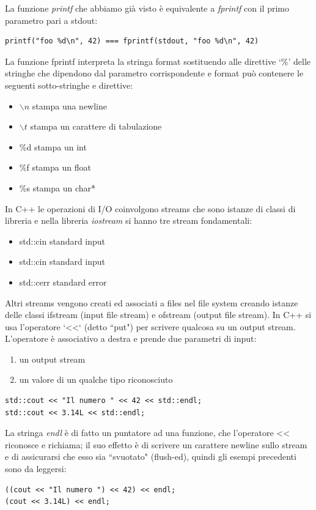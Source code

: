 \documentclass[a4paper,12pt, oneside]{book}
\begin{document}
La funzione \textit{printf} che abbiamo già visto è equivalente a
\textit{fprintf} con il primo parametro pari a stdout:
\begin{verbatim}
printf("foo %d\n", 42) === fprintf(stdout, "foo %d\n", 42)
\end{verbatim}
La funzione fprintf interpreta la stringa format sostituendo
alle direttive ‘\%’ delle stringhe che dipendono dal parametro
corrispondente e format può contenere le seguenti sotto-stringhe e direttive:
\begin{itemize}
\item $\backslash n$ stampa una newline
\item $\backslash t$ stampa un carattere di tabulazione
\item \%d stampa un int
\item \%f stampa un float
\item \%s stampa un char*

\end{itemize}
In C++ le operazioni di I/O coinvolgono streams che sono
istanze di classi di libreria e nella libreria \textit{iostream} si hanno tre stream fondamentali:
\begin{itemize}
\item std::cin standard input
\item std::cin standard input
\item std::cerr standard error
\end{itemize}
Altri streams vengono creati ed associati a files nel file system
creando istanze delle classi ifstream (input file stream) e
ofstream (output file stream). In C++ si usa l’operatore ‘<<‘ (detto “put") per scrivere qualcosa
su un output stream. L’operatore è associativo a destra e prende due parametri di
input:
\begin{enumerate}
\item un output stream
\item un valore di un qualche tipo riconosciuto
\end{enumerate}
\begin{verbatim}
std::cout << "Il numero " << 42 << std::endl;
std::cout << 3.14L << std::endl;
\end{verbatim}
La stringa \textit{endl }è di fatto un puntatore ad una funzione, che
l’operatore << riconosce e richiama; il suo effetto è di scrivere
un carattere newline sullo stream e di assicurarsi che esso sia
“svuotato" (flush-ed), quindi gli esempi precedenti sono da leggersi:
\begin{verbatim}
((cout << "Il numero ") << 42) << endl;
(cout << 3.14L) << endl;
\end{verbatim}
\end{document}
